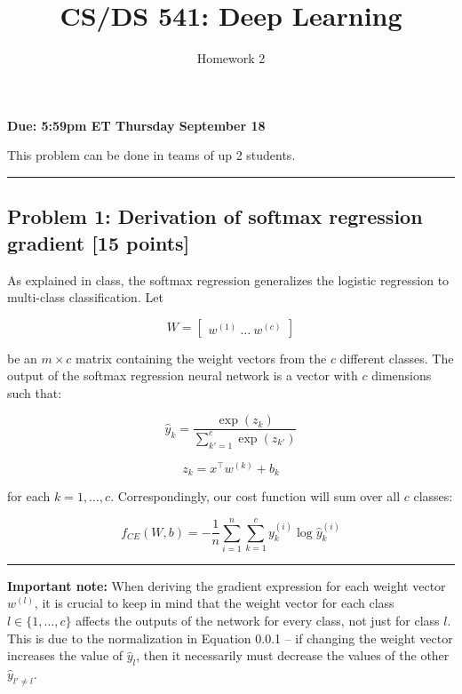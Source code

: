 \documentclass[
  letterpaper,
  DIV=11,
  numbers=noendperiod]{scrartcl}
\title{CS/DS 541: Deep Learning}
\subtitle{Homework 2}
\author{}
\date{}
\begin{document}
\maketitle



\textbf{Due: 5:59pm ET Thursday September 18}

This problem can be done in teams of up 2 students.

\begin{center}\rule{0.5\linewidth}{0.5pt}\end{center}

\subsection{Problem 1: Derivation of softmax regression gradient {[}15
points{]}}\label{problem-1-derivation-of-softmax-regression-gradient-15-points}

As explained in class, the softmax regression generalizes the logistic
regression to multi-class classification. Let

\[
W = 
\begin{bmatrix}
w^{(1)} \ \ldots \ w^{(c)}
\end{bmatrix}
\]

be an \(m \times c\) matrix containing the weight vectors from the \(c\)
different classes. The output of the softmax regression neural network
is a vector with \(c\) dimensions such that:

\[
\hat{y}_k = \frac{\exp(z_k)}{\sum_{k'=1}^c \exp(z_{k'})} \tag{0.0.1}
\]

\[
z_k = x^\top w^{(k)} + b_k
\]

for each \(k = 1, \ldots, c\). Correspondingly, our cost function will
sum over all \(c\) classes:

\[
f_{CE}(W,b) = -\frac{1}{n} \sum_{i=1}^n \sum_{k=1}^c y_k^{(i)} \log \hat{y}_k^{(i)}
\]

\begin{center}\rule{0.5\linewidth}{0.5pt}\end{center}

\textbf{Important note:} When deriving the gradient expression for each
weight vector \(w^{(l)}\), it is crucial to keep in mind that the weight
vector for each class \(l \in \{1, \ldots, c\}\) affects the outputs of
the network for every class, not just for class \(l\). This is due to
the normalization in Equation 0.0.1 -- if changing the weight vector
increases the value of \(\hat{y}_l\), then it necessarily must decrease
the values of the other \(\hat{y}_{l' \neq l}\).
\end{document}
